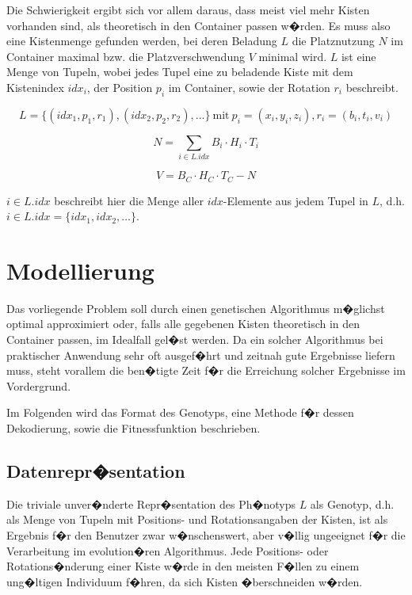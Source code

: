 \documentclass[a4paper,abstracton,12pt]{scrartcl}
\begin{document}
Die Schwierigkeit ergibt sich vor allem daraus, dass meist viel mehr Kisten vorhanden sind, als theoretisch in den Container passen w�rden. Es muss also eine Kistenmenge gefunden werden, bei deren Beladung $L$ die Platznutzung $N$ im Container maximal bzw. die Platzverschwendung $V$ minimal wird. $L$ ist eine Menge von Tupeln, wobei jedes Tupel eine zu beladende Kiste mit dem Kistenindex $idx_i$, der Position $p_i$ im Container, sowie der Rotation $r_i$ beschreibt.

\begin{equation}
L = \{(idx_1,p_1,r_1),(idx_2,p_2,r_2),\ldots\} \ \text{mit} \ p_i = (x_i, y_i, z_i), r_i = (b_i, t_i, v_i)
\end{equation}

\begin{equation}
N = \sum_{i\in L.idx} B_i \cdot H_i \cdot T_i
\end{equation}

\begin{equation}
V = B_C \cdot H_C \cdot T_C - N
\end{equation}

$i\in L.idx$ beschreibt hier die Menge aller $idx$-Elemente aus jedem Tupel in $L$, d.h. $i\in L.idx = \{idx_1, idx_2, \ldots\}$.

\section{Modellierung}

Das vorliegende Problem soll durch einen genetischen Algorithmus m�glichst optimal approximiert oder, falls alle gegebenen Kisten theoretisch in den Container passen, im Idealfall gel�st werden. Da ein solcher Algorithmus bei praktischer Anwendung sehr oft ausgef�hrt und zeitnah gute Ergebnisse liefern muss, steht vorallem die ben�tigte Zeit f�r die Erreichung solcher Ergebnisse im Vordergrund. 

Im Folgenden wird das Format des Genotyps, eine Methode f�r dessen Dekodierung, sowie die Fitnessfunktion beschrieben.

\subsection{Datenrepr�sentation}

Die triviale unver�nderte Repr�sentation des Ph�notyps $L$ als Genotyp, d.h. als Menge von Tupeln mit Positions- und Rotationsangaben der Kisten, ist als Ergebnis f�r den Benutzer zwar w�nschenswert, aber v�llig ungeeignet f�r die Verarbeitung im evolution�ren Algorithmus. Jede Positions- oder Rotations�nderung einer Kiste w�rde in den meisten F�llen zu einem ung�ltigen Individuum f�hren, da sich Kisten �berschneiden w�rden.
\end{document}
